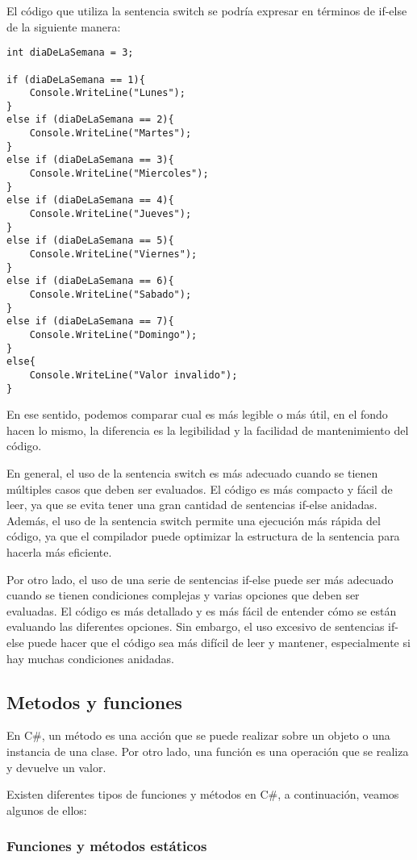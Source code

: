 \documentclass[executivepaper]{article}
\begin{document}
El código que utiliza la sentencia switch se podría expresar en términos de if-else de la siguiente manera:

\begin{lstlisting}
int diaDeLaSemana = 3;

if (diaDeLaSemana == 1){
    Console.WriteLine("Lunes");
}
else if (diaDeLaSemana == 2){
    Console.WriteLine("Martes");
}
else if (diaDeLaSemana == 3){
    Console.WriteLine("Miercoles");
}
else if (diaDeLaSemana == 4){
    Console.WriteLine("Jueves");
}
else if (diaDeLaSemana == 5){
    Console.WriteLine("Viernes");
}
else if (diaDeLaSemana == 6){
    Console.WriteLine("Sabado");
}
else if (diaDeLaSemana == 7){
    Console.WriteLine("Domingo");
}
else{
    Console.WriteLine("Valor invalido");
}
\end{lstlisting}
En ese sentido, podemos comparar cual es más legible o más útil, en el fondo hacen lo mismo, la diferencia es la legibilidad y la facilidad de mantenimiento del código.

En general, el uso de la sentencia switch es más adecuado cuando se tienen múltiples casos que deben ser evaluados. El código es más compacto y fácil de leer, ya que se evita tener una gran cantidad de sentencias if-else anidadas. Además, el uso de la sentencia switch permite una ejecución más rápida del código, ya que el compilador puede optimizar la estructura de la sentencia para hacerla más eficiente.

Por otro lado, el uso de una serie de sentencias if-else puede ser más adecuado cuando se tienen condiciones complejas y varias opciones que deben ser evaluadas. El código es más detallado y es más fácil de entender cómo se están evaluando las diferentes opciones. Sin embargo, el uso excesivo de sentencias if-else puede hacer que el código sea más difícil de leer y mantener, especialmente si hay muchas condiciones anidadas.

\subsection{Metodos y funciones}

En C\#, un método es una acción que se puede realizar sobre un objeto o una instancia de una clase. Por otro lado, una función es una operación que se realiza y devuelve un valor.

Existen diferentes tipos de funciones y métodos en C\#, a continuación, veamos algunos de ellos:

\subsubsection*{Funciones y métodos estáticos}
\end{document}
